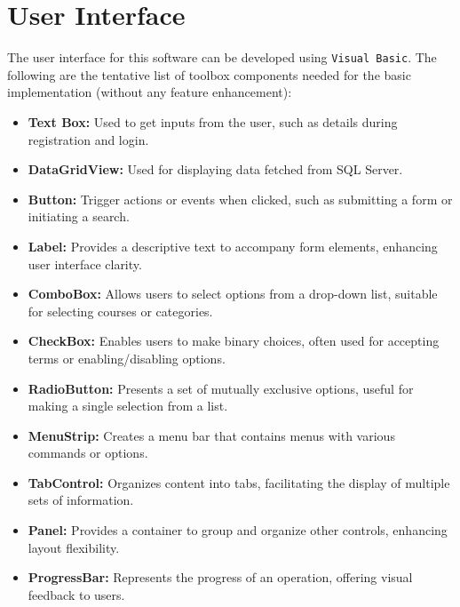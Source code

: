 \documentclass[12pt,a4paper]{article}
\begin{document}
\section{User Interface}
	The user interface for this software can be developed using \texttt{Visual Basic}. The following are the tentative list of toolbox components needed for the basic implementation (without any feature enhancement):
    \begin{itemize}
\item \textbf{Text Box:} Used to get inputs from the user, such as details during registration and login.

    \item \textbf{DataGridView:} Used for displaying data fetched from SQL Server.

    \item \textbf{Button:} Trigger actions or events when clicked, such as submitting a form or initiating a search.

    \item \textbf{Label:} Provides a descriptive text to accompany form elements, enhancing user interface clarity.

    \item \textbf{ComboBox:} Allows users to select options from a drop-down list, suitable for selecting courses or categories.

    \item \textbf{CheckBox:} Enables users to make binary choices, often used for accepting terms or enabling/disabling options.

    \item \textbf{RadioButton:} Presents a set of mutually exclusive options, useful for making a single selection from a list.

    \item \textbf{MenuStrip:} Creates a menu bar that contains menus with various commands or options.

    \item \textbf{TabControl:} Organizes content into tabs, facilitating the display of multiple sets of information.

    \item \textbf{Panel:} Provides a container to group and organize other controls, enhancing layout flexibility.

    \item \textbf{ProgressBar:} Represents the progress of an operation, offering visual feedback to users.


\end{itemize}
\end{document}
